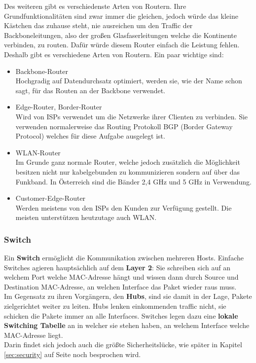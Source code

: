 \documentclass[12pt,a4paper]{report}
\begin{document}
Des weiteren gibt es verschiedenste Arten von Routern. Ihre Grundfunktionalitäten sind zwar immer die gleichen, jedoch würde das kleine Kästchen das zuhause steht, nie ausreichen um den Traffic der Backboneleitungen, also der großen Glasfaserleitungen welche die Kontinente verbinden, zu routen. Dafür würde diesem Router einfach die Leistung fehlen.\\
Deshalb gibt es verschiedene Arten von Routern. Ein paar wichtige sind:\\
\begin{itemize}
\item Backbone-Router\\
Hochgradig auf Datendurchsatz optimiert, werden sie, wie der Name schon sagt, für das Routen an der Backbone verwendet.
\item Edge-Router, Border-Router\\
Wird von ISPs verwendet um die Netzwerke ihrer Clienten zu verbinden. Sie verwenden normalerweise das Routing Protokoll BGP (Border Gateway Protocol) welches für diese Aufgabe ausgelegt ist.
\item WLAN-Router\\
Im Grunde ganz normale Router, welche jedoch zusätzlich die Möglichkeit besitzen nicht nur kabelgebunden zu kommunizieren sondern auf über das Funkband. In Österreich sind die Bänder 2,4 GHz und 5 GHz in Verwendung.
\item Customer-Edge-Router\\
Werden meistens von den ISPs den Kunden zur Verfügung gestellt. Die meisten unterstützen heutzutage auch WLAN.
\end{itemize}
\subsubsection{Switch}
Ein \textbf{Switch} ermöglicht die Kommunikation zwischen mehreren Hosts. Einfache Switches agieren hauptsächlich auf dem \textbf{Layer 2}: Sie schreiben sich auf an welchem Port welche MAC-Adresse hängt und wissen dann durch Source und Destination MAC-Adresse, an welchen Interface das Paket wieder raus muss.\\

Im Gegensatz zu ihren Vorgängern, den \textbf{Hubs}, sind sie damit in der Lage, Pakete zielgerichtet weiter zu leiten. Hubs lenken einkommenden traffic nicht, sie schicken die Pakete immer an alle Interfaces. Switches legen dazu eine \textbf{lokale Switching Tabelle} an in welcher sie stehen haben, an welchem Interface welche MAC-Adresse liegt.\\
Darin findet sich jedoch auch die größte Sicherheitslücke, wie später in Kapitel \ref{sec:security} auf Seite \pageref{sec:security} noch besprochen wird.\\
\end{document}
